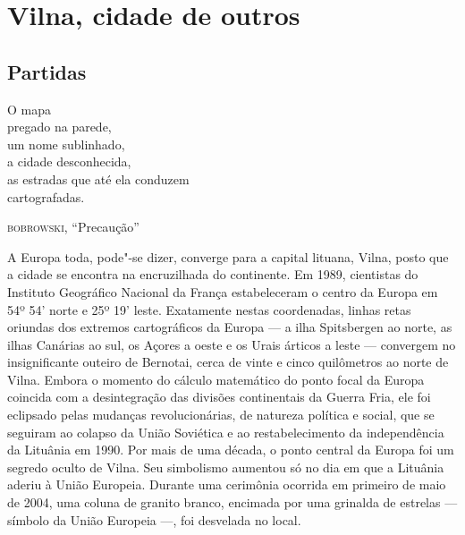\part[Vilna, cidade de outros]{Vilna, cidade de outros}

\chapter{Partidas}

\epigraph{O mapa\\
pregado na parede,\\
um nome sublinhado,\\
a cidade desconhecida,\\
as estradas que até ela conduzem\\
cartografadas.} {\textsc{bobrowski}, ``Precaução''}


A Europa toda, pode"-se dizer, converge para a capital lituana, Vilna,
posto que a cidade se encontra na encruzilhada do continente. Em 1989,
cientistas do Instituto Geográfico Nacional da França estabeleceram o
centro da Europa em 54º 54' norte e 25º 19' leste. Exatamente nestas
coordenadas, linhas retas oriundas dos extremos cartográficos da Europa
--- a ilha Spitsbergen ao norte, as ilhas Canárias ao sul, os Açores a
oeste e os Urais árticos a leste --- convergem no insignificante outeiro
de Bernotai, cerca de vinte e cinco quilômetros ao norte de Vilna.
Embora o momento do cálculo matemático do ponto focal da Europa coincida
com a desintegração das divisões continentais da Guerra Fria, ele foi
eclipsado pelas mudanças revolucionárias, de natureza política e social,
que se seguiram ao colapso da União Soviética e ao restabelecimento da
independência da Lituânia em 1990. Por mais de uma década, o ponto
central da Europa foi um segredo oculto de Vilna. Seu simbolismo
aumentou só no dia em que a Lituânia aderiu à União Europeia. Durante
uma cerimônia ocorrida em primeiro de maio de 2004, uma coluna de
granito branco, encimada por uma grinalda de estrelas --- símbolo da União
Europeia ---, foi desvelada no local.

